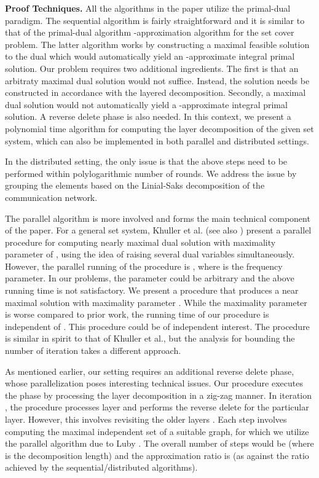 \documentclass[11pt]{article}
\begin{document}
{\bf Proof Techniques. }
All the algorithms in the paper utilize the primal-dual paradigm. 
The sequential algorithm is fairly straightforward and it is similar to that of
the primal-dual algorithm -approximation algorithm for the set cover problem.
The latter algorithm works by constructing a maximal feasible solution to the dual
which would automatically yield an -approximate integral primal solution.
Our problem requires two additional ingredients. The first is that an arbitraty maximal dual
solution would not suffice. Instead, the solution needs be constructed in accordance
with the layered decomposition. Secondly, a maximal dual solution would not automatically
yield a -approximate integral primal solution. A reverse delete phase is also needed.
In this context, we present a polynomial time algorithm for computing the layer decomposition of the given set system,
which can also be implemented in both parallel and distributed settings.

In the distributed setting, the only issue is that the above steps need to be performed within 
polylogarithmic number of rounds. We address the issue by grouping the elements
based on the Linial-Saks decomposition \cite{LS} of the communication network.

The parallel algorithm is more involved and forms the main technical component of the paper.
For a general set system, Khuller et al. \cite{KVY} (see also \cite{Gandhi}) 
present a parallel procedure for computing nearly maximal dual solution with maximality parameter of ,
using the idea of raising several dual variables simultaneously.
However, the parallel running of the procedure is , where  is the frequency parameter.
In our problems, the parameter  could be arbitrary and the above running time is not satisfactory.
We present a procedure that produces a near maximal solution with maximality parameter .
While the maximality parameter is worse compared to prior work, the running time of our procedure is independent of .
This procedure could be of independent interest. The procedure is similar in spirit to that of Khuller et al.,
but the analysis for bounding the number of iteration takes a different approach.

As mentioned earlier, our setting requires an additional reverse delete phase,
whose parallelization poses interesting technical issues.
Our procedure executes the phase by processing the layer decomposition in a zig-zag manner.
In iteration , the procedure processes layer  and performs the reverse delete for the particular layer.
However, this involves revisiting the older layers .
Each step involves computing the maximal independent set of a suitable graph, for which we utilize
the parallel algorithm due to Luby \cite{Luby}.
The overall number of steps would be  (where  is the decomposition length)
and the approximation ratio is  (as against the ratio  achieved by the sequential/distributed algorithms).
\end{document}
